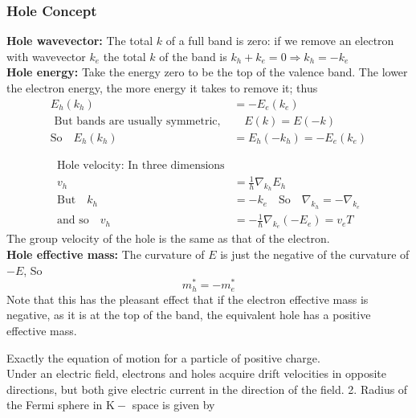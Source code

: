 \subsubsection{Hole Concept}
\textbf{Hole wavevector:} The total $k$ of a full band is zero: if we remove an electron with wavevector $k_{e}$ the total $k$ of the band is $k_{h}+k_{e}=0 \Rightarrow k_{h}=-k_{e}$\\
\textbf{Hole energy:} Take the energy zero to be the top of the valence band. The lower the electron energy, the more energy it takes to remove it; thus
\begin{align*}
E_{h}\left(k_{h}\right)&=-E_{e}\left(k_{e}\right)\\
\text { But bands are usually symmetric, }& \quad E(k)=E(-k)\\
\text{So}\quad E_{h}\left(k_{h}\right)&=E_{h}\left(-k_{h}\right)=-E_{e}\left(k_{e}\right)
\end{align*}

\begin{align*}
\text{Hole velocity: In three dimensions}\\
v_{h}&=\frac{1}{h} \nabla_{k_{h}} E_{h}\\
\text{But}\quad k_{h}&=-k_{e} \quad\text{So}\quad \nabla_{k_{h}}=-\nabla_{k_{e}}\\
\text{and so}\quad v_{h}&=-\frac{1}{\hbar} \nabla_{k_{e}}\left(-E_{e}\right)=v_{e}
T\end{align*}
The group velocity of the hole is the same as that of the electron.\\
\textbf{Hole effective mass:} The curvature of $E$ is just the negative of the curvature of $-E$,
So
$$
m_{h}^{*}=-m_{e}^{*}
$$
Note that this has the pleasant effect that if the electron effective mass is negative, as it is at the top of the band, the equivalent hole has a positive effective mass.

Exactly the equation of motion for a particle of positive charge.\\
Under an electric field, electrons and holes acquire drift velocities in opposite directions, but both give electric current in the direction of the field. 2. Radius of the Fermi sphere in $\mathrm{K}-$ space is given by
